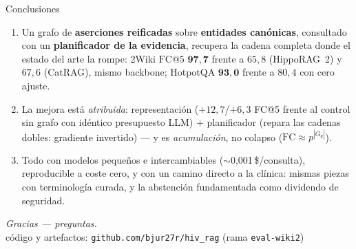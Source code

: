 \documentclass[aspectratio=169,10pt]{beamer}
\newcommand{\hippo}{HippoRAG~2}
\begin{document}
\begin{frame}{Conclusiones}
\begin{enumerate}
\item Un grafo de \textbf{aserciones reificadas} sobre \textbf{entidades
  canónicas}, consultado con un \textbf{planificador de la evidencia}, recupera
  la cadena completa donde el estado del arte la rompe:
  2Wiki $\mathrm{FC@}5$ $\mathbf{97{,}7}$ frente a $65{,}8$ (\hippo{}) y $67{,}6$
  (CatRAG), mismo backbone; HotpotQA $\mathbf{93{,}0}$ frente a $80{,}4$ con cero ajuste.
\item La mejora está \emph{atribuida}: representación ($+12{,}7$/$+6{,}3$ FC@5
  frente al control sin grafo con idéntico presupuesto LLM) $+$ planificador
  (repara las cadenas dobles: gradiente invertido) --- y es \emph{acumulación},
  no colapso ($\mathrm{FC}\approx p^{|G_q|}$).
\item Todo con modelos pequeños e intercambiables ($\sim$0{,}001\,\$/consulta),
  reproducible a coste cero, y con un camino directo a la clínica: mismas
  piezas con terminología curada, y la abstención fundamentada como dividendo
  de seguridad.
\end{enumerate}
\vspace{2mm}
\centering
\emph{Gracias --- preguntas.}\\[1mm]
\scriptsize código y artefactos: \texttt{github.com/bjur27r/hiv\_rag} (rama \texttt{eval-wiki2})
\end{frame}
\end{document}
